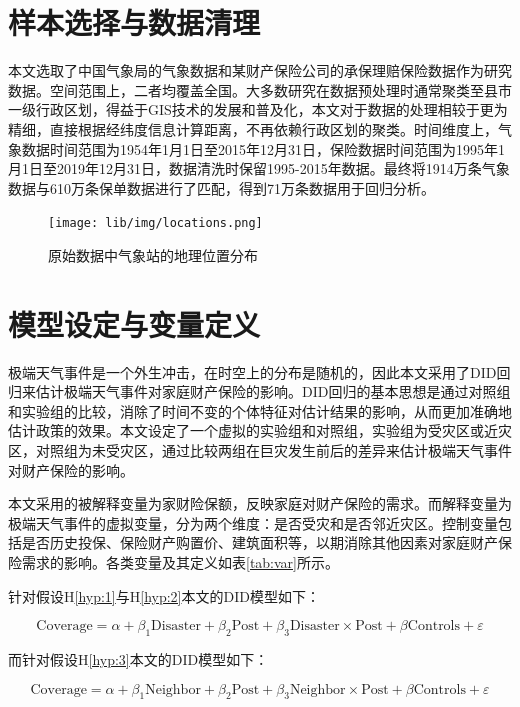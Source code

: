 \section{样本选择与数据清理}\label{sec:data}

本文选取了中国气象局的气象数据和某财产保险公司的承保理赔保险数据作为研究数据。空间范围上，二者均覆盖全国。大多数研究在数据预处理时通常聚类至县市一级行政区划\citep{0Do,杨娜娜2019自然灾害与企业现金持有}，得益于GIS技术的发展和普及化，本文对于数据的处理相较于更为精细，直接根据经纬度信息计算距离，不再依赖行政区划的聚类。时间维度上，气象数据时间范围为1954年1月1日至2015年12月31日，保险数据时间范围为1995年1月1日至2019年12月31日，数据清洗时保留1995-2015年数据。最终将1914万条气象数据与610万条保单数据进行了匹配，得到71万条数据用于回归分析。

\begin{figure}[H]
    \centering
    \texttt{[image: lib/img/locations.png]}
    \caption{原始数据中气象站的地理位置分布}
    \label{fig:location}
\end{figure}

\section{模型设定与变量定义}

极端天气事件是一个外生冲击，在时空上的分布是随机的，因此本文采用了DID回归来估计极端天气事件对家庭财产保险的影响。DID回归的基本思想是通过对照组和实验组的比较，消除了时间不变的个体特征对估计结果的影响，从而更加准确地估计政策的效果。本文设定了一个虚拟的实验组和对照组，实验组为受灾区或近灾区，对照组为未受灾区，通过比较两组在巨灾发生前后的差异来估计极端天气事件对财产保险的影响。

本文采用的被解释变量为家财险保额，反映家庭对财产保险的需求。而解释变量为极端天气事件的虚拟变量，分为两个维度：是否受灾和是否邻近灾区。控制变量包括是否历史投保、保险财产购置价、建筑面积等，以期消除其他因素对家庭财产保险需求的影响。各类变量及其定义如表\ref{tab:var}所示。


针对假设H\ref{hyp:1}与H\ref{hyp:2}本文的DID模型如下：

\begin{equation}
    \text{Coverage}=\alpha+\beta_1\text{Disaster}+\beta_2\text{Post}+\beta_3\text{Disaster}\times\text{Post}+\beta\text{Controls}+\varepsilon
    \label{eq:DID_1}
\end{equation}

而针对假设H\ref{hyp:3}本文的DID模型如下：

\begin{equation}
    \text{Coverage}=\alpha+\beta_1\text{Neighbor}+\beta_2\text{Post}+\beta_3\text{Neighbor}\times\text{Post}+\beta\text{Controls}+\varepsilon
    \label{eq:DID_2}
\end{equation}
